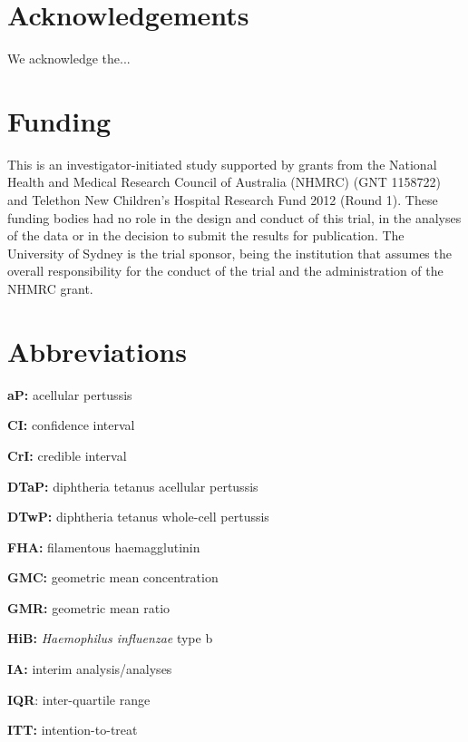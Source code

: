 \documentclass{bmcart}
\begin{document}

\begin{backmatter}

\section*{Acknowledgements}%
We acknowledge the...

\section*{Funding}%
This is an investigator-initiated study supported by grants from the National Health and Medical Research Council of Australia (NHMRC) (GNT 1158722) and Telethon New Children's Hospital Research Fund 2012 (Round 1).
These funding bodies had no role in the design and conduct of this trial, in the analyses of the data or in the decision to submit the results for publication.
The University of Sydney is the trial sponsor, being the institution that assumes the overall responsibility for the conduct of the trial and the administration of the NHMRC grant.

\section*{Abbreviations}%

\textbf{aP:} acellular pertussis

\textbf{CI:} confidence interval

\textbf{CrI:} credible interval

\textbf{DTaP:} diphtheria tetanus acellular pertussis 

\textbf{DTwP:} diphtheria tetanus whole-cell pertussis 

\textbf{FHA:} filamentous haemagglutinin

\textbf{GMC:} geometric mean concentration

\textbf{GMR:} geometric mean ratio

\textbf{HiB:} \textit{Haemophilus influenzae} type b 

\textbf{IA:} interim analysis/analyses

\textbf{IQR}: inter-quartile range

\textbf{ITT:} intention-to-treat


\end{backmatter}
\end{document}
